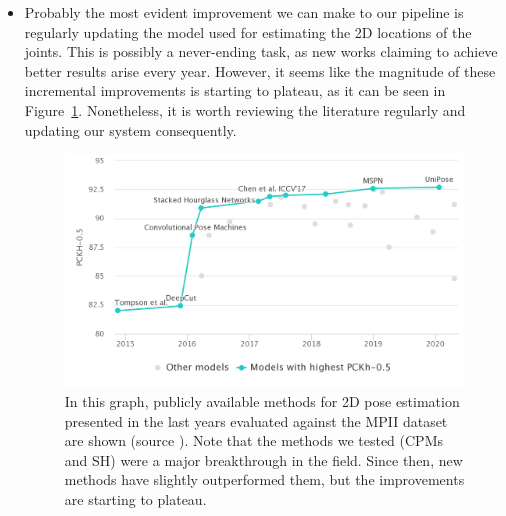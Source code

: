\begin{itemize}
    \item Probably the most evident improvement we can make to our pipeline is regularly updating the model used for estimating the 2D locations of the joints. This is possibly a never-ending task, as new works claiming to achieve better results arise every year. However, it seems like the magnitude of these incremental improvements is starting to plateau, as it can be seen in Figure~\ref{fig:mpii_results}. Nonetheless, it is worth reviewing the literature regularly and updating our system consequently.
    
    \begin{figure}[h]
        \centering
        \includegraphics[width=\textwidth]{figures/chart.png}
        \caption{In this graph, publicly available methods for 2D pose estimation presented in the last years evaluated against the MPII dataset are shown (source \cite{papers_with_code}). Note that the methods we tested (CPMs and SH) were a major breakthrough in the field. Since then, new methods have slightly outperformed them, but the improvements are starting to plateau.}
        \label{fig:mpii_results}
    \end{figure}


\end{itemize}
